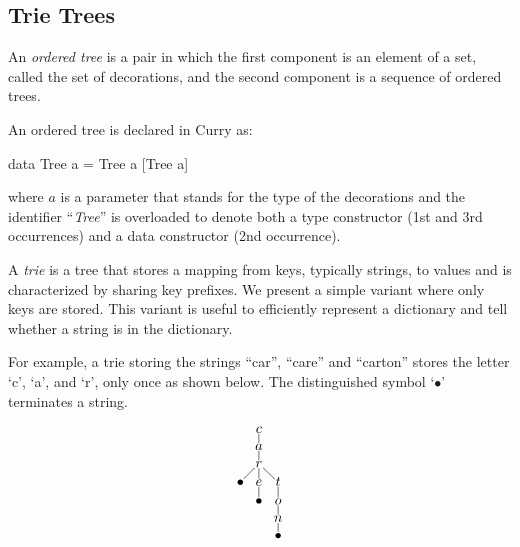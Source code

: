 \subsection{Trie Trees}

An \emph{ordered tree} is a pair
in which the first component is an element of a set,
called the set of decorations, and the second component
is a sequence of ordered trees.

\medskip\noindent
An ordered tree is declared in Curry as:
%
\begin{curry}
data Tree a = Tree a [Tree a]
\end{curry}
%
where $a$ is a parameter that stands for the type of the
decorations and the identifier ``\emph{Tree}'' is overloaded to
denote both a type constructor (1st and 3rd occurrences)
and a data constructor (2nd occurrence).

A \emph{trie} is a tree that stores a mapping from keys,
typically strings, to values and is characterized by sharing
key prefixes.  We present a simple variant where only keys
are stored.  This variant is useful to efficiently
represent a dictionary and tell whether a string is
in the dictionary.
%
\begin{pdfversion}
For example, a trie storing the strings ``car'', ``care''
and ``carton'' stores the letter `c', `a', and `r', only
once as shown below.  The distinguished symbol `$\bullet$'
terminates a string.

$$
\xymatrix@1@C=6pt@R=6pt@M=1pt{
  & c \ar@{-}[d] \\  
  & a \ar@{-}[d] \\  
  & r \ar@{-}[dl]\ar@{-}[d]\ar@{-}[dr] \\  
  \bullet & e \ar@{-}[d] & t \ar@{-}[d] \\
  & \bullet & o \ar@{-}[d] \\  
  & & n \ar@{-}[d] \\  
  & & \bullet
}
$$
\end{pdfversion}

